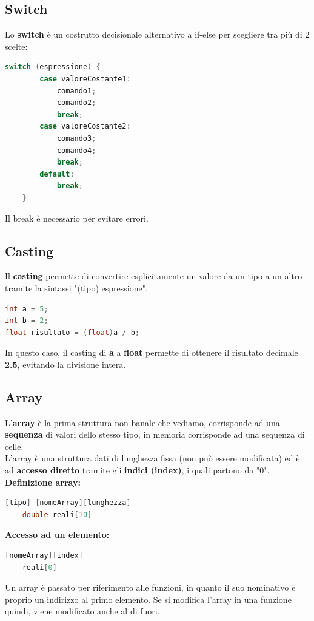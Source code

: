 \documentclass[12pt,a4paper]{article}
\begin{document}
\subsection{Switch}
Lo \textbf{switch} è un costrutto decisionale alternativo a if-else per scegliere tra più di 2 scelte:
\begin{lstlisting}[language=C]
    switch (espressione) {
        case valoreCostante1:
            comando1;
            comando2;
            break;
        case valoreCostante2:
            comando3;
            comando4;
            break;
        default:
            break;
    }
\end{lstlisting}
Il break è necessario per evitare errori.
\subsection{Casting}
Il \textbf{casting} permette di convertire esplicitamente un valore da un
tipo a un altro tramite la sintassi "(tipo) espressione".
\begin{lstlisting}[language=C]
int a = 5;
int b = 2;
float risultato = (float)a / b;
\end{lstlisting}
In questo caso, il casting di \textbf{a} a \textbf{float} permette di
ottenere il risultato decimale \textbf{2.5}, evitando la divisione intera.

\subsection{Array}
L'\textbf{array} è la prima struttura non banale che vediamo, corrisponde ad una \textbf{sequenza} di valori dello stesso tipo, in memoria corrisponde ad una sequenza di celle.\\
L'array è una struttura dati di lunghezza fissa (non può essere modificata) ed è ad \textbf{accesso diretto} tramite gli \textbf{indici (index)}, i quali partono da "0".\\
\textbf{Definizione array:}
\begin{lstlisting}[language=C]
    [tipo] [nomeArray][lunghezza]
    double reali[10]
\end{lstlisting}
\textbf{Accesso ad un elemento:}
\begin{lstlisting}[language=C]
    [nomeArray][index]
    reali[0]
\end{lstlisting}
Un array è passato per riferimento alle funzioni, in quanto il suo nominativo è proprio un indirizzo al primo elemento. Se si modifica l'array in una funzione quindi, viene modificato anche al di fuori.
\end{document}
